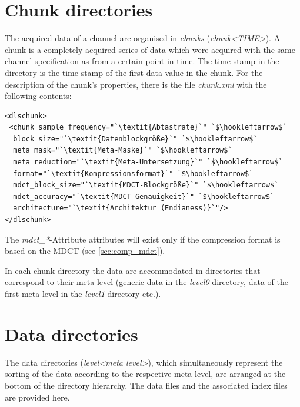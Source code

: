\documentclass[a4paper,12pt,BCOR6mm,bibtotoc,idxtotoc]{scrbook}
\begin{document}

\section{Chunk directories}
\label{sec:data_chunks}

The acquired data of a channel are organised in \textit{chunks}
(\textit{chunk\textless TIME\textgreater}). A chunk is a
completely acquired series of data which were acquired with the same
channel specification as from a certain point in time. The time stamp
in the directory is the time stamp of the first data value in the
chunk. For the description of the chunk's properties, there is the
file \textit{chunk.xml} with the following contents:

\begin{lstlisting}
<dlschunk>
 <chunk sample_frequency="`\textit{Abtastrate}`" `$\hookleftarrow$`
  block_size="`\textit{Datenblockgröße}`" `$\hookleftarrow$`
  meta_mask="`\textit{Meta-Maske}`" `$\hookleftarrow$`
  meta_reduction="`\textit{Meta-Untersetzung}`" `$\hookleftarrow$`
  format="`\textit{Kompressionsformat}`" `$\hookleftarrow$`
  mdct_block_size="`\textit{MDCT-Blockgröße}`" `$\hookleftarrow$`
  mdct_accuracy="`\textit{MDCT-Genauigkeit}`" `$\hookleftarrow$`
  architecture="`\textit{Architektur (Endianess)}`"/>
</dlschunk>
\end{lstlisting}

The \textit{mdct\_*}-Attribute attributes will exist only if the compression
format is based on the MDCT (see \autoref{sec:comp_mdct}).

In each chunk directory the data are accommodated in directories that correspond to their meta level (generic data in the \textit{level0} directory, data of the first meta level in the \textit{level1} directory etc.).


\section{Data directories}
\label{sec:data_data}

The data directories (\textit{level\textless meta level\textgreater}), which simultaneously represent the sorting of the data according to the respective meta level, are arranged at the bottom of the directory hierarchy. The data files and the associated index files are provided here.
\end{document}
